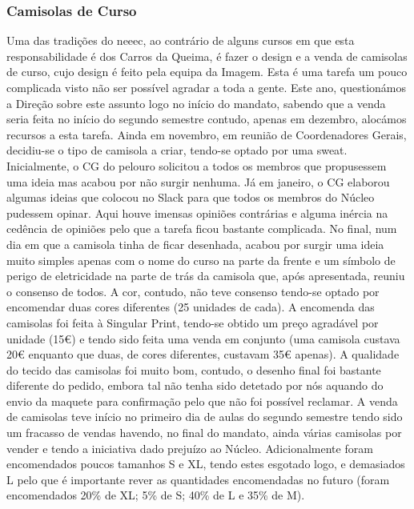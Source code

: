 
\subsubsection{Camisolas de Curso}

Uma das tradições do \acrshort{neeec}, ao contrário de alguns cursos em que esta responsabilidade é dos Carros da Queima, é fazer o design e a venda de camisolas de curso, cujo design é feito pela equipa da Imagem. Esta é uma tarefa um pouco complicada visto não ser possível agradar a toda a gente. Este ano, questionámos a Direção sobre este assunto logo no início do mandato, sabendo que a venda seria feita no início do segundo semestre contudo, apenas em dezembro, alocámos recursos a esta tarefa. Ainda em novembro, em reunião de Coordenadores Gerais, decidiu-se o tipo de camisola a criar, tendo-se optado por uma sweat. Inicialmente, o CG do pelouro solicitou a todos os membros que propusessem uma ideia mas acabou por não surgir nenhuma. Já em janeiro, o CG elaborou algumas ideias que colocou no Slack para que todos os membros do Núcleo pudessem opinar. Aqui houve imensas opiniões contrárias e alguma inércia na cedência de opiniões pelo que a tarefa ficou bastante complicada. No final, num dia em que a camisola tinha de ficar desenhada, acabou por surgir uma ideia muito simples apenas com o nome do curso na parte da frente e um símbolo de perigo de eletricidade na parte de trás da camisola que, após apresentada, reuniu o consenso de todos. A cor, contudo, não teve consenso tendo-se optado por encomendar duas cores diferentes (25 unidades de cada). A encomenda das camisolas foi feita à Singular Print, tendo-se obtido um preço agradável por unidade (15€) e tendo sido feita uma venda em conjunto (uma camisola custava 20€ enquanto que duas, de cores diferentes, custavam 35€ apenas). A qualidade do tecido das camisolas foi muito bom, contudo, o desenho final foi bastante diferente do pedido, embora tal não tenha sido detetado por nós aquando do envio da maquete para confirmação pelo que não foi possível reclamar. A venda de camisolas teve início no primeiro dia de aulas do segundo semestre tendo sido um fracasso de vendas havendo, no final do mandato, ainda várias camisolas por vender e tendo a iniciativa dado prejuízo ao Núcleo. Adicionalmente foram encomendados poucos tamanhos S e XL, tendo estes esgotado logo, e demasiados L pelo que é importante rever as quantidades encomendadas no futuro (foram encomendados 20\% de XL; 5\% de S; 40\% de L e 35\% de M).